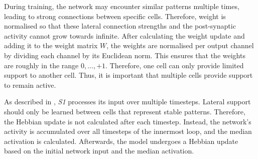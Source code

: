 During training, the network  may encounter similar patterns multiple times, leading to strong connections between specific cells. Therefore, weight is normalised so that these lateral connection strengths and the post-synaptic activity cannot grow towards infinite. After calculating the weight update and adding it to the weight matrix $W$, the weights are normalised per output channel by dividing each channel by its Euclidean norm. This ensures that the weights are roughly in the range $0, ..., +1$.
Therefore, one cell can only provide limited support to another cell.
Thus, it is important that multiple cells provide support to remain active.

As described in , \emph{S1} processes its input over multiple timesteps. Lateral support should only be learned between cells that represent stable patterns.
Therefore, the Hebbian update is not calculated after each timestep.
Instead, the network's activity is accumulated over all timesteps of the innermost loop, and the median activation is calculated.
Afterwards, the model undergoes a Hebbian update based on the initial network input and the median activation.

















